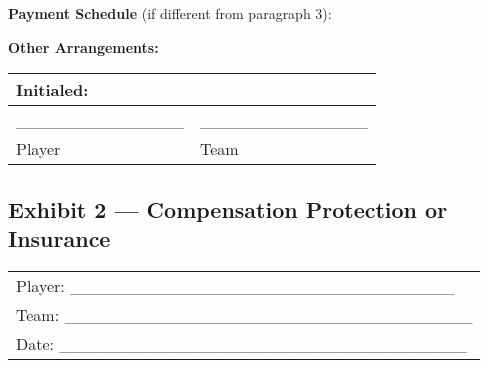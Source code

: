 \documentclass[
]{book}
\begin{document}
\textbf{Payment Schedule} (if different from paragraph 3):

\textbf{Other Arrangements:}

\begin{longtable}[]{@{}ll@{}}
\toprule()
Initialed: & \\
\midrule()
\endhead
\_\_\_\_\_\_\_\_\_\_\_\_\_\_ & \_\_\_\_\_\_\_\_\_\_\_\_\_\_ \\
Player & Team \\
\bottomrule()
\end{longtable}

\newpage

\hypertarget{exhibit-2-compensation-protection-or-insurance}{%
\subsection{Exhibit 2 --- Compensation Protection or Insurance}\label{exhibit-2-compensation-protection-or-insurance}}

\begin{longtable}[]{@{}l@{}}
\toprule()
\endhead
Player: \_\_\_\_\_\_\_\_\_\_\_\_\_\_\_\_\_\_\_\_\_\_\_\_\_\_\_\_\_\_\_\_ \\
Team: \_\_\_\_\_\_\_\_\_\_\_\_\_\_\_\_\_\_\_\_\_\_\_\_\_\_\_\_\_\_\_\_\_\_ \\
Date: \_\_\_\_\_\_\_\_\_\_\_\_\_\_\_\_\_\_\_\_\_\_\_\_\_\_\_\_\_\_\_\_\_\_ \\
\bottomrule()
\end{longtable}
\end{document}
